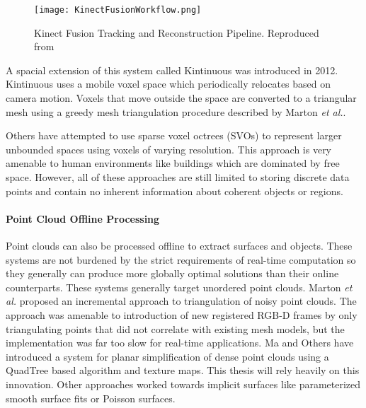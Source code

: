 \begin{figure}[ht]
    \centering
    \texttt{[image: KinectFusionWorkflow.png]}
    \caption{Kinect Fusion Tracking and Reconstruction Pipeline. Reproduced from\cite{izadi2011kinectfusion}}
    \label{fig:kinfu_workflow}
\end{figure}

A spacial extension of this system called Kintinuous was introduced in 2012\cite{whelan2012kintinuous,whelan:odometry}. Kintinuous uses a mobile voxel space which periodically relocates based on camera motion. Voxels that move outside the space are converted to a triangular mesh using a greedy mesh triangulation procedure described by Marton \textit{et al.}\cite{marton:fastreconstruction}.\par
Others have attempted to use sparse voxel octrees (SVOs) to represent larger unbounded spaces using voxels of varying resolution\cite{laine:svo,fastvoxelmaps}. This approach is very amenable to human environments like buildings which are dominated by free space. However, all of these approaches are still limited to storing discrete data points and contain no inherent information about coherent objects or regions.
\paragraph{Point Cloud Offline Processing}
Point clouds can also be processed offline to extract surfaces and objects. These systems are not burdened by the strict requirements of real-time computation so they generally can produce more globally optimal solutions than their online counterparts. These systems generally target unordered point clouds. Marton \textit{et al.} proposed an incremental approach to triangulation of noisy point clouds\cite{marton:fastreconstruction}. The approach was amenable to introduction of new registered RGB-D frames by only triangulating points that did not correlate with existing mesh models, but the implementation was far too slow for real-time applications. Ma and Others have introduced a system for planar simplification of dense point clouds using a QuadTree based algorithm\cite{ma2013planar,planesegmentationQTB} and texture maps. This thesis will rely heavily on this innovation. Other approaches worked towards implicit surfaces like parameterized smooth surface fits \cite{hormann2003scattered} or Poisson surfaces\cite{kazhdan2006poisson,bolitho2009parallel}.
